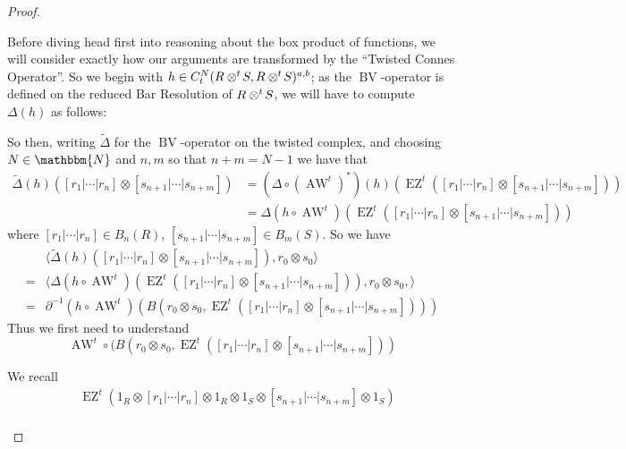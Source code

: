 \documentclass{article}
\makeatletter
\newcommand{\ten}{\otimes}
\newcommand{\twisten}{\otimes^t\hspace{-1pt}}
\newcommand{\bv}{\operatorname{BV}}
\newcommand{\awt}{\operatorname{AW}^t}
\newcommand{\ezt}{\operatorname{EZ}^t}
\newcommand{\elr}{[r_1 | \cdots | r_n]}
\newcommand{\els}{[s_{n+1} | \cdots |s_{n+m}]}
\theoremstyle{plain}
\theoremstyle{definition}
\def\namedlabel#1#2{\begingroup
    #2%
    \def\@currentlabel{#2}%
    \phantomsection\label{#1}\endgroup 
}
\makeatother
\begin{document}
\begin{proof} 
\begin{pfparts}
\item[\namedlabel{pfpart:setup}{Setup}.]
Before diving head first into reasoning about the box product of functions, we will consider exactly how our arguments are transformed by the ``Twisted Connes Operator''. So we begin with $h\in C_t^{N}(R \twisten S, R \twisten S)^{a,b}$; as the $\bv$-operator is defined on the reduced Bar Resolution of $R \twisten S$, we will have to compute $\Delta(h)$ as follows:
\begin{center}
\end{center}
So then, writing $\tilde{\Delta}$ for the $\bv$-operator on the twisted complex, and choosing $N \in \mathbbm{N}$ and $n,m$ so that $n+m=N-1$ we have that
$$\begin{aligned} \tilde{\Delta}(h)([r_1 | \cdots | r_n] \ten \els) &= (\Delta \circ (\awt)^*)(h) (\ezt([r_1 | \cdots | r_n] \otimes \els)) \\
 &= \Delta(h \circ \awt)(\ezt ([r_1 | \cdots | r_n] \otimes \els)) \end{aligned}$$
 where $[r_1 | \cdots | r_n] \in B_n(R)$, $\els \in B_m(S)$. So we have
 $$\begin{aligned} &\langle  \tilde{\Delta}(h)([r_1 | \cdots | r_n] \otimes \els), r_0 \otimes s_0 \rangle \\
 =& \langle \Delta(h \circ \awt)(\ezt ([r_1 | \cdots | r_n] \otimes \els)), r_0 \otimes s_0,  \rangle  \\
 =& \partial^{-1}(h \circ \awt)( B(r_0 \otimes s_0, \ezt([r_1 | \cdots | r_n ] \ten \els)))
 \end{aligned}$$
 Thus we first need to understand 
 $$\awt \circ ( B(r_0 \otimes s_0, \ezt([r_1 | \cdots | r_n ] \ten \els))$$
 \vspace{3pt}
\item[\namedlabel{pfpart:formofmap}{\noindent The form of $ {B(r_0 \otimes s_0, \ezt([r_1 | \cdots | r_n ] \ten \els))}$. }]
We recall
$$\begin{aligned} &\ezt(1_R \ten \elr \ten 1_R \ten 1_S \ten \els \ten 1_S) \\

\end{aligned}$$
\end{pfparts}
\end{proof}
\end{document}
